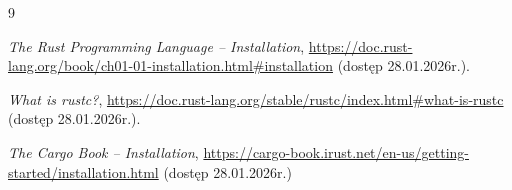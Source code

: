 \documentclass{article}
\begin{document}
\newpage
\begin{thebibliography}{9}

\emph{The Rust Programming Language -- Installation}, \url{https://doc.rust-lang.org/book/ch01-01-installation.html\#installation} (dostęp 28.01.2026r.).

\emph{What is rustc?}, \url{https://doc.rust-lang.org/stable/rustc/index.html\#what-is-rustc} (dostęp 28.01.2026r.).

\emph{The Cargo Book -- Installation}, \url{https://cargo-book.irust.net/en-us/getting-started/installation.html} (dostęp 28.01.2026r.)

\end{thebibliography}
\end{document}
